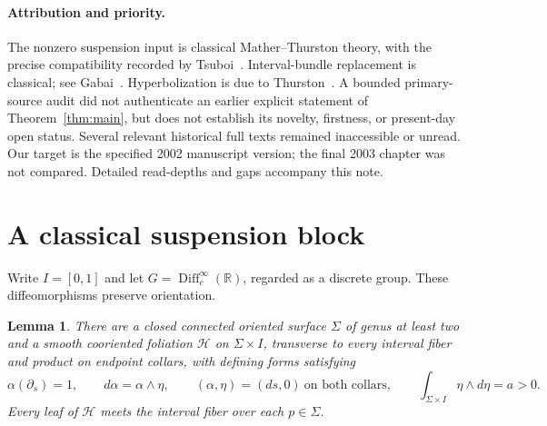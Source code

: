 \documentclass[11pt]{article}
\newtheorem{lemma}{Lemma}
\newcommand{\Diff}{\operatorname{Diff}}
\begin{document}
\paragraph{Attribution and priority.}
The nonzero suspension input is classical Mather--Thurston theory,
with the precise compatibility recorded by Tsuboi~\cite{T81}.
Interval-bundle replacement is classical; see
Gabai~\cite[Operation~2.1.3]{G92}. Hyperbolization is due to
Thurston~\cite{Th98}. A bounded primary-source audit did not authenticate
an earlier explicit statement of Theorem~\ref{thm:main}, but does not
establish its novelty, firstness, or present-day open status.
Several relevant historical full texts remained inaccessible or unread.
Our target is the specified 2002 manuscript version; the final 2003
chapter was not compared. Detailed read-depths and gaps accompany this
note.

\section{A classical suspension block}
Write $I=[0,1]$ and let $G=\Diff^\infty_c(\mathbb R)$, regarded as a
discrete group. These diffeomorphisms preserve orientation.

\begin{lemma}\label{lem:block}
There are a closed connected oriented surface $\Sigma$ of genus at least
two and a smooth cooriented foliation $\mathcal H$ on $\Sigma\times I$,
transverse to every interval fiber and product on endpoint collars,
with defining forms satisfying
\[
 \alpha(\partial_s)=1,\qquad d\alpha=\alpha\wedge\eta,\qquad
 (\alpha,\eta)=(ds,0)\ \text{on both collars},\qquad
 \int_{\Sigma\times I}\eta\wedge d\eta=a>0 .
\]
Every leaf of $\mathcal H$ meets the interval fiber over each $p\in\Sigma$.
\end{lemma}
\end{document}
